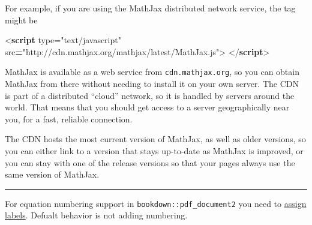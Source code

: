 \documentclass[
  a4paper,
  twoside,
  openright]{book}
\newenvironment{Shaded}{\begin{snugshade}}{\end{snugshade}}
\newcommand{\DataTypeTok}[1]{\textcolor[rgb]{0.13,0.29,0.53}{#1}}
\newcommand{\KeywordTok}[1]{\textcolor[rgb]{0.13,0.29,0.53}{\textbf{#1}}}
\newcommand{\OperatorTok}[1]{\textcolor[rgb]{0.81,0.36,0.00}{\textbf{#1}}}
\newcommand{\OtherTok}[1]{\textcolor[rgb]{0.56,0.35,0.01}{#1}}
\newcommand{\StringTok}[1]{\textcolor[rgb]{0.31,0.60,0.02}{#1}}
\theoremstyle{definition}
\theoremstyle{definition}
\theoremstyle{definition}
\theoremstyle{definition}
\theoremstyle{remark}
\begin{document}
For example, if you are using the MathJax distributed network service, the tag might be

\begin{Shaded}
\begin{Highlighting}[]
\DataTypeTok{\textless{}}\KeywordTok{script}\OtherTok{ type=}\StringTok{"text/javascript"}
\OtherTok{   src}\OperatorTok{=}\StringTok{"http://cdn.mathjax.org/mathjax/latest/MathJax.js"}\DataTypeTok{\textgreater{}}
\DataTypeTok{\textless{}/}\KeywordTok{script}\DataTypeTok{\textgreater{}}
\end{Highlighting}
\end{Shaded}

MathJax is available as a web service from \texttt{cdn.mathjax.org}, so you can obtain MathJax from there without needing to install it on your own server. The CDN is part of a distributed ``cloud'' network, so it is handled by servers around the world. That means that you should get access to a server geographically near you, for a fast, reliable connection.

The CDN hosts the most current version of MathJax, as well as older versions, so you can either link to a version that stays up-to-date as MathJax is improved, or you can stay with one of the release versions so that your pages always use the same version of MathJax.

\begin{center}\rule{0.5\linewidth}{0.5pt}\end{center}

For equation numbering support in \texttt{bookdown::pdf\_document2} you need to \href{https://bookdown.org/yihui/bookdown/markdown-extensions-by-bookdown.html\#equations}{assign labels}. Defualt behavior is not adding numbering.
\end{document}
